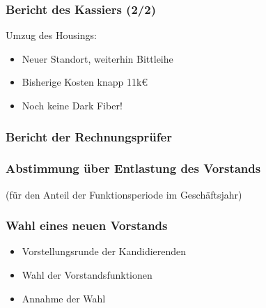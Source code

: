 \documentclass[17pt]{beamer} %
\begin{document}
\begin{frame}
	\frametitle{Bericht des Kassiers (2/2)}
	Umzug des Housings:
	\begin{itemize}
		\item Neuer Standort, weiterhin Bittleihe
		\item Bisherige Kosten knapp 11k€
		\item Noch keine Dark Fiber!
	\end{itemize}
\end{frame}



\begin{frame}
	\frametitle{Bericht der Rechnungsprüfer}
\end{frame}



\begin{frame}
	\frametitle{Abstimmung über Entlastung des Vorstands}
	(für den Anteil der Funktionsperiode im Geschäftsjahr)
\end{frame}



\begin{frame}
	\frametitle{Wahl eines neuen Vorstands}
	\begin{itemize}
		\item Vorstellungsrunde der Kandidierenden
		\item Wahl der Vorstandsfunktionen
		\item Annahme der Wahl
	\end{itemize}
\end{frame}
\end{document}
